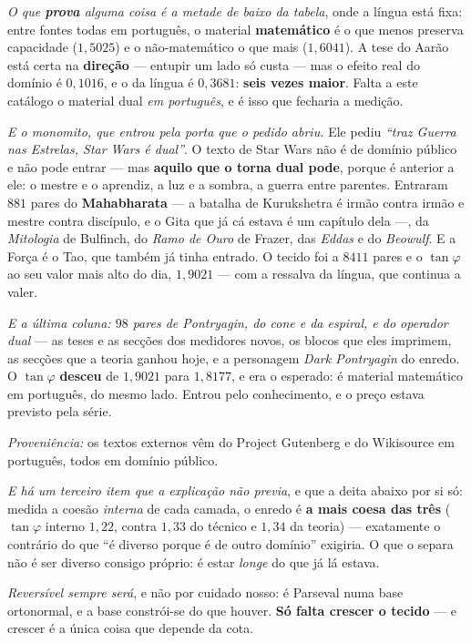\documentclass[11pt]{article}
\theoremstyle{plain}
\theoremstyle{remark}
\begin{document}
\begin{itemize}
\emph{O que \textbf{prova} alguma coisa é a metade de baixo da tabela}, onde a língua está fixa: entre
fontes todas em português, o material \textbf{matemático} é o que menos preserva capacidade
($1{,}5025$) e o não-matemático o que mais ($1{,}6041$). A tese do Aarão está certa na
\textbf{direção} --- entupir um lado só custa --- mas o efeito real do domínio é
$0{,}1016$, e o da língua é $0{,}3681$: \textbf{seis vezes maior}. Falta a este catálogo o
material dual \emph{em português}, e é isso que fecharia a medição.

\emph{E o monomito, que entrou pela porta que o pedido abriu.} Ele pediu \emph{``traz Guerra nas
Estrelas, Star Wars é dual''}. O texto de Star Wars não é de domínio público e não pode entrar ---
mas \textbf{aquilo que o torna dual pode}, porque é anterior a ele: o mestre e o aprendiz, a luz e
a sombra, a guerra entre parentes. Entraram $881$ pares do \textbf{Mahabharata} --- a batalha de
Kurukshetra é irmão contra irmão e mestre contra discípulo, e o Gita que já cá estava é um capítulo
dela ---, da \emph{Mitologia} de Bulfinch, do \emph{Ramo de Ouro} de Frazer, das \emph{Eddas} e
do \emph{Beowulf}. E a Força é o Tao, que também já tinha entrado. O tecido foi a $8411$ pares e o
$\tan\varphi$ ao seu valor mais alto do dia, $1{,}9021$ --- com a ressalva da língua, que continua
a valer.

\emph{E a última coluna: $98$ pares de Pontryagin, do cone e da espiral, e do operador dual} ---
as teses e as secções dos medidores novos, os blocos que eles imprimem, as secções que a teoria
ganhou hoje, e a personagem \emph{Dark Pontryagin} do enredo. O $\tan\varphi$ \textbf{desceu} de
$1{,}9021$ para $1{,}8177$, e era o esperado: é material matemático em português, do mesmo lado.
Entrou pelo conhecimento, e o preço estava previsto pela série.

\emph{Proveniência:} os textos externos vêm do Project Gutenberg e do Wikisource em português,
todos em domínio público.

\emph{E há um terceiro item que a explicação não previa}, e que a deita abaixo por si só: medida a
coesão \emph{interna} de cada camada, o enredo é \textbf{a mais coesa das três}
($\tan\varphi$ interno $1{,}22$, contra $1{,}33$ do técnico e $1{,}34$ da teoria) --- exatamente o
contrário do que ``é diverso porque é de outro domínio'' exigiria. O que o separa não é ser diverso
consigo próprio: é estar \emph{longe} do que já lá estava.

\emph{Reversível sempre será}, e não por cuidado nosso: é Parseval numa base ortonormal, e a base
constrói-se do que houver. \textbf{Só falta crescer o tecido} --- e crescer é a única coisa que
depende da cota.


\end{itemize}
\end{document}
